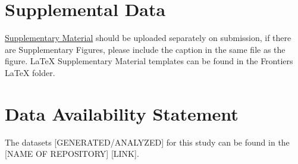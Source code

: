 \documentclass[utf8]{frontiersSCNS}
\begin{document}
\section*{Supplemental Data}
 \href{http://home.frontiersin.org/about/author-guidelines#SupplementaryMaterial}{Supplementary Material} should be uploaded separately on submission, if there are Supplementary Figures, please include the caption in the same file as the figure. LaTeX Supplementary Material templates can be found in the Frontiers LaTeX folder.

\section*{Data Availability Statement}
The datasets [GENERATED/ANALYZED] for this study can be found in the [NAME OF REPOSITORY] [LINK].





\end{document}
